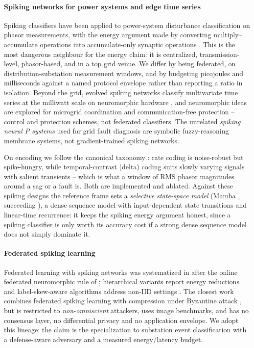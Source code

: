 \documentclass[review,12pt]{elsarticle}
\begin{document}
\paragraph{Spiking networks for power systems and edge time series}
Spiking classifiers have been applied to power-system disturbance
classification on phasor measurements, with the energy argument made by
converting multiply--accumulate operations into accumulate-only synaptic
operations \cite{mahapatra2021}. This is the most dangerous neighbour for
the energy claim: it is centralized, transmission-level, phasor-based,
and in a top grid venue. We differ by being federated, on
distribution-substation measurement windows, and by budgeting picojoules
and milliseconds against a named protocol envelope rather than reporting
a ratio in isolation. Beyond the grid, evolved spiking networks classify
multivariate time series at the milliwatt scale on neuromorphic hardware
\cite{ghawaly2025}, and neuromorphic ideas are explored for microgrid
coordination and communication-free protection
\cite{song2024spiketalk,prabhakar2026synapse} -- control and protection
schemes, not federated classifiers. The unrelated \emph{spiking neural P
systems} used for grid fault diagnosis are symbolic fuzzy-reasoning
membrane systems, not gradient-trained spiking networks.

On encoding we follow the canonical taxonomy \cite{auge2021}: rate coding
is noise-robust but spike-hungry, while temporal-contrast (delta) coding
suits slowly varying signals with salient transients -- which is what a
window of RMS phasor magnitudes around a sag or a fault is. Both are
implemented and ablated. Against these spiking designs the reference
frame sets a \emph{selective state-space model} (Mamba
\cite{gu2023mamba}, succeeding \cite{gu2022s4}), a dense sequence model
with input-dependent state transitions and linear-time recurrence: it
keeps the spiking energy argument honest, since a spiking classifier is
only worth its accuracy cost if a strong dense sequence model does not
simply dominate it.

\paragraph{Federated spiking learning}
Federated learning with spiking networks was systematized in
\cite{venkatesha2021} after the online federated neuromorphic rule of
\cite{skatchkovsky2020}; hierarchical variants report energy reductions
\cite{aouedi2023hfedsnn} and label-skew-aware algorithms address non-IID
settings \cite{yu2025fedlec}. The closest work combines federated spiking
learning with compression under Byzantine attack
\cite{nguyen2025robust}, but is restricted to \emph{non-omniscient}
attackers, uses image benchmarks, and has no consensus layer, no
differential privacy and no application envelope. We adopt this lineage:
the claim is the specialization to substation event classification with
a defense-aware adversary and a measured energy/latency budget.
\end{document}
